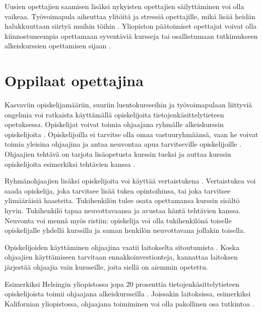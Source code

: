 \documentclass[finnish]{tktltiki2}
\theoremstyle{definition}
\theoremstyle{remark}
\begin{document}
Uusien opettajien saamisen lisäksi nykyisten opettajien säilyttäminen voi olla vaikeaa. Työ\-voi\-ma\-pu\-la aiheuttaa ylitöitä ja stressiä opettajille, mikä lisää heidän halukkuuttaan siirtyä muihin töihin \cite{Roberts99}. Yliopiston päätoimiset opettajat voivat olla kiinnostuneempia opettamaan syventäviä kursseja tai osallistumaan tutkimukseen alkeiskurssien opettamisen sijaan \cite{Shannon98}. \par














\section{Oppilaat opettajina}
Kasvaviin opiskelijamääriin, suuriin luentokursseihin ja työvoimapulaan liittyviä ongelmia voi ratkaista käyttämällä opiskelijoita tietojenkäsittelytieteen opetuksessa. Opiskelijat voivat toimia ohjaajana ryhmälle alkeiskurssin o\-pis\-ke\-li\-joi\-ta \cite{Reges88}. Opiskelijoilla ei tarvitse olla omaa vastuuryhmäänsä, vaan he voivat toimia yleisina ohjaajina ja antaa neuvontaa apua tarvitseville opiskelijoille \cite{Vikberg, Vihavainen}. Ohjaajien tehtävä on tarjota lisäopetusta kurssin tueksi ja auttaa kurssin opiskelijoita esimerkiksi tehtävien kanssa \cite{Patitsas12_3}. \par

Ryhmänohjaajien lisäksi opiskelijoita voi käyttää vertaistukena \cite{Tashakkori05}. Vertaistukea voi saada opiskelija, joka tarvitsee lisää tukea opintoihinsa, tai joka tarvitsee ylimääräisiä haasteita. Tukihenkilön tulee osata opettamansa kurssin sisältö hyvin. Tukihenkilö tapaa neuvottavaansa ja avustaa häntä tehtävien kanssa. Neuvonta voi mennä myös ristiin; opiskelija voi olla tukihenkilönä toiselle opiskelijalle yhdellä kurssilla ja saman henkilön neuvottavana jollakin toisella. \par

Opiskelijoiden käyttäminen ohjaajina vaatii laitokselta sitoutumista \cite{Kopp00}. Koska ohjaajien käyttämiseen tarvitaan ennakkoinvestionteja, kannattaa laitoksen järjestää ohjaajia vain kursseille, joita siellä on aiemmin opetettu. \par

Esimerkiksi Helsingin yliopistossa jopa 20 prosenttia tie\-to\-jen\-kä\-sit\-te\-ly\-tie\-teen opiskelijoista toimii ohjaajana alkeiskursseilla \cite{Vihavainen}. Joissakin laitoksissa, esimerkiksi Kalifornian yliopistossa, ohjaajana toimiminen voi olla pakollinen osa tutkintoa \cite{Kay95}.  \par
\end{document}
